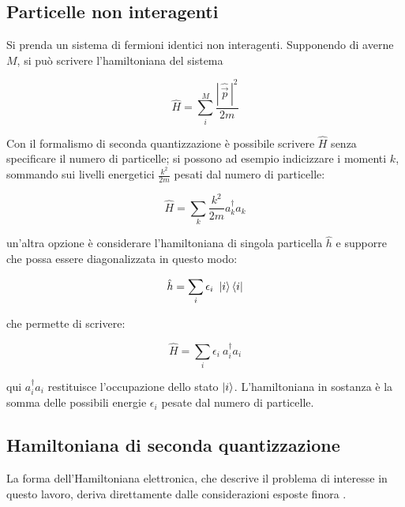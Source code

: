 \subsection{Particelle non interagenti}

Si prenda un sistema di fermioni identici non interagenti. Supponendo di averne $M$, si può scrivere l'hamiltoniana del sistema

\begin{equation}\label{eqn:hamiltoniana-libera}
    \hat{H} = \sum_{i}^{M} \frac{|\,\hat{\vec{p}}\,|^2}{2m}
\end{equation}

Con il formalismo di seconda quantizzazione è possibile scrivere $\hat{H}$ senza specificare il numero di particelle; si possono ad esempio indicizzare i momenti $k$, sommando sui livelli energetici $\frac{k^2}{2m}$ pesati dal numero di particelle:

\begin{equation}\label{eqn:hamiltoniana-libera-seconda-q}
    \hat{H} = \sum_{k} \frac{k^2}{2m} a^{\dagger}_{k} a_{k}
\end{equation}

un'altra opzione è considerare l'hamiltoniana di singola particella $\hat{h}$ e supporre che possa essere diagonalizzata in questo modo:

\begin{equation}
    \hat{h} = \sum_{i} \epsilon_i\ \ket{i}\bra{i}
\end{equation}

che permette di scrivere:

\begin{equation}
    \hat{H} = \sum_{i} \epsilon_i\ a^{\dagger}_{i} a_{i}
\end{equation}

qui $a^{\dagger}_{i} a_{i}$ restituisce l'occupazione dello stato $\ket{i}$. L'hamiltoniana in sostanza è la somma delle possibili energie $\epsilon_i$ pesate dal numero di particelle.


\subsection{Hamiltoniana di seconda quantizzazione}\label{subsec:hamiltoniana-seconda-q}

La forma dell’Hamiltoniana elettronica, che descrive il problema di interesse in questo lavoro, deriva direttamente dalle considerazioni esposte finora \cite{modern_quantum_chem}.

